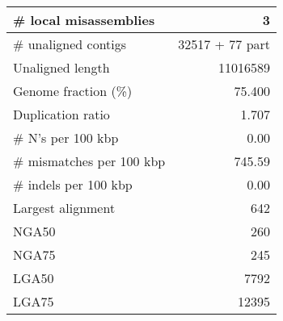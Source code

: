 \documentclass[12pt,a4paper]{article}
\begin{document}
\begin{table}[ht]
\begin{center}
\begin{tabular}{|l*{1}{|r}|}
\# local misassemblies & 3 \\ \hline
\# unaligned contigs & 32517 + 77 part \\ \hline
Unaligned length & 11016589 \\ \hline
Genome fraction (\%) & 75.400 \\ \hline
Duplication ratio & 1.707 \\ \hline
\# N's per 100 kbp & 0.00 \\ \hline
\# mismatches per 100 kbp & 745.59 \\ \hline
\# indels per 100 kbp & 0.00 \\ \hline
Largest alignment & 642 \\ \hline
NGA50 & 260 \\ \hline
NGA75 & 245 \\ \hline
LGA50 & 7792 \\ \hline
LGA75 & 12395 \\ \hline
\end{tabular}
\end{center}
\end{table}
\end{document}
